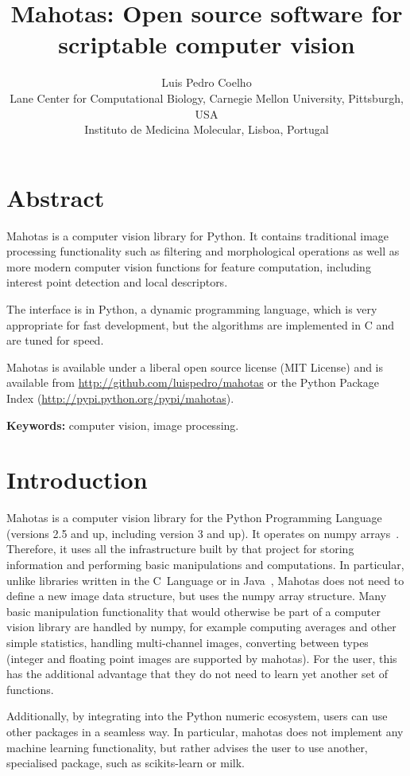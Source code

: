\documentclass{article}
\title{Mahotas: Open source software for scriptable computer vision}
\author{Luis Pedro Coelho\\
Lane Center for Computational Biology, Carnegie Mellon University, Pittsburgh, USA\\
Instituto de Medicina Molecular, Lisboa, Portugal}
\newcommand*{\cpp}{{C\nolinebreak[4]\hspace{-.05em}\raisebox{.4ex}{\tiny\textbf{++}}}}
\begin{document}
\maketitle

\section*{Abstract}
Mahotas is a computer vision library for Python. It contains traditional image
processing functionality such as filtering and morphological operations as well
as more modern computer vision functions for feature computation, including
interest point detection and local descriptors.

The interface is in Python, a dynamic programming language, which is very
appropriate for fast development, but the algorithms are implemented in \cpp{}
and are tuned for speed.

Mahotas is available under a liberal open source license (MIT License) and is
available from \url{http://github.com/luispedro/mahotas} or the Python Package
Index (\url{http://pypi.python.org/pypi/mahotas}).

\textbf{Keywords:} computer vision, image processing.

\section{Introduction}

Mahotas is a computer vision library for the Python Programming Language
(versions 2.5 and up, including version 3 and up). It operates on numpy
arrays~\citep{numpystructure}. Therefore, it uses all the infrastructure built
by that project for storing information and performing basic manipulations and
computations. In particular, unlike libraries written in the C~Language or in
Java~\citep{Marcel:2010:TMP:1873951.1874254}, Mahotas does not need to define a
new image data structure, but uses the numpy array structure. Many basic
manipulation functionality that would otherwise be part of a computer vision
library are handled by numpy, for example computing averages and other simple
statistics, handling multi-channel images, converting between types (integer
and floating point images are supported by mahotas). For the user, this has the
additional advantage that they do not need to learn yet another set of
functions.

Additionally, by integrating into the Python numeric ecosystem, users can use
other packages in a seamless way. In particular, mahotas does not implement any
machine learning functionality, but rather advises the user to use another,
specialised package, such as scikits-learn or milk.
\end{document}

